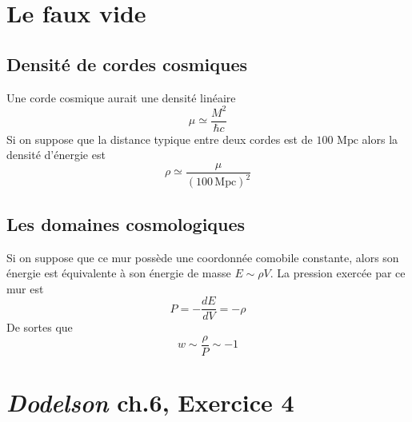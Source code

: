\documentclass{article}
\numberwithin{equation}{section}
\begin{document}
\section{Le faux vide}
\subsection{Densité de cordes cosmiques}
Une corde cosmique aurait une densité linéaire
\[
        \mu \simeq \frac{M^2}{\hbar c}
\]
Si on suppose que la distance typique entre deux cordes 
est de $100\,\,\mathrm{Mpc}$ alors la 
densité d'énergie est
\[
        \rho \simeq \frac{\mu}{(100\, \mathrm{Mpc})^{2}}
\]

\subsection{Les domaines cosmologiques}
Si on suppose que ce mur possède une coordonnée comobile constante, alors 
son énergie est équivalente à son énergie de masse $E \sim \rho V$. 
La pression exercée par ce mur est 
\[
        P = - \frac{d E}{d V} = -\rho
\]
De sortes que
\[
        \boxed{w \sim \frac{\rho}{P} \sim -1}
\]
\section{\textit{Dodelson} ch.6, Exercice 4}
\end{document}
